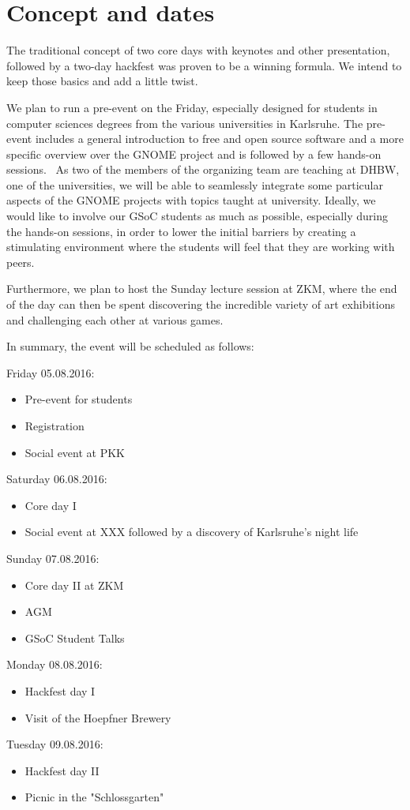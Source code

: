 
\section{Concept and dates}

The traditional concept of two core days with keynotes and other presentation, followed by a two-day hackfest was proven to be a winning formula. We intend to keep those basics and add a little twist. 

We plan to run a pre-event on the Friday, especially designed for students in computer sciences degrees from the various universities in Karlsruhe. The pre-event includes a general introduction to free and open source software and a more specific overview over the GNOME project and is followed by a few hands-on sessions.  As two of the members of the organizing team are teaching at DHBW, one of the universities, we will be able to seamlessly integrate some particular aspects of the GNOME projects with topics taught at university. Ideally, we would like to involve our GSoC students as much as possible, especially during the hands-on sessions, in order to lower the initial barriers by creating a stimulating environment where the students will feel that they are working with peers. 

Furthermore, we plan to host the Sunday lecture session at ZKM, where the end of the day can then be spent discovering the incredible variety of art exhibitions and challenging each other at various games.

In summary, the event will be scheduled as follows:

Friday 05.08.2016:
\begin{itemize}
\item Pre-event for students
\item Registration
\item Social event at PKK 
\end{itemize}

Saturday 06.08.2016:
\begin{itemize}
\item  Core day I
\item  Social event at XXX followed by a discovery of Karlsruhe's night life
\end{itemize}

Sunday 07.08.2016:
\begin{itemize}
\item  Core day II at ZKM
\item  AGM
\item  GSoC Student Talks
\end{itemize}

Monday 08.08.2016:
\begin{itemize}
\item  Hackfest day I
\item  Visit of the Hoepfner Brewery 
\end{itemize}

Tuesday 09.08.2016:
\begin{itemize}
\item  Hackfest day II
\item  Picnic in the "Schlossgarten" 
\end{itemize}


